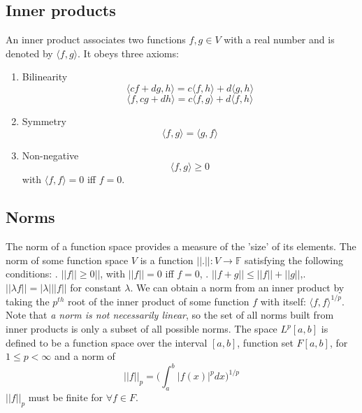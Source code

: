 \documentclass[]{article}
\begin{document}
\subsection{Inner products}
An inner product associates two functions $f, g \in V$ with a real number and is denoted by $\langle f, g \rangle$. It obeys three axioms:
\begin{enumerate}
	\item Bilinearity \begin{equation} \langle cf+dg, h \rangle = c\langle f, h  \rangle + d\langle g , h \rangle \end{equation}
	\begin{equation} \langle f,cg+ dh \rangle = c\langle f, g  \rangle + d\langle f , h \rangle \end{equation}
	\item Symmetry \begin{equation} \langle f,g \rangle = \langle g,f \rangle \end{equation}
	\item Non-negative \begin{equation} \langle f,g \rangle \geq 0 \end{equation}
	with $\langle f,f \rangle = 0$ iff $f = 0$.
\end{enumerate}

\subsection{Norms}
The norm of a function space provides a measure of the 'size' of its elements. The norm of some function space $V$ is a function $||.||: V \longrightarrow \mathbb{F}$ satisfying the following conditions:
\newline
{}. $||f|| \geq 0||$, with $||f|| = 0$ iff $f=0$, . $||f+g|| \leq ||f|| + ||g||$,. $||\lambda f|| = |\lambda|||f||$ for constant $\lambda$.
\newline
\newline
We can obtain a norm from an inner product by taking the $p^{th}$ root of the inner product of some function $f$ with itself: $\langle f,f \rangle^{1/p}$. Note that \textit{a norm is not necessarily linear}, so the set of all norms built from inner products is only a subset of all possible norms.
\newline
\newline
The space $L^{p}[a,b]$ is defined to be a function space over the interval $[a,b]$, function set $F[a,b]$, for $1 \leq p < \infty$ and a norm of
\begin{equation} ||f||_{p} = \bigg( \int_{a}^{b} |f(x)|^{p}dx  \bigg)^{1/p} \end{equation}
$||f||_{p}$ must be finite for $\forall f \in F$.
\end{document}
